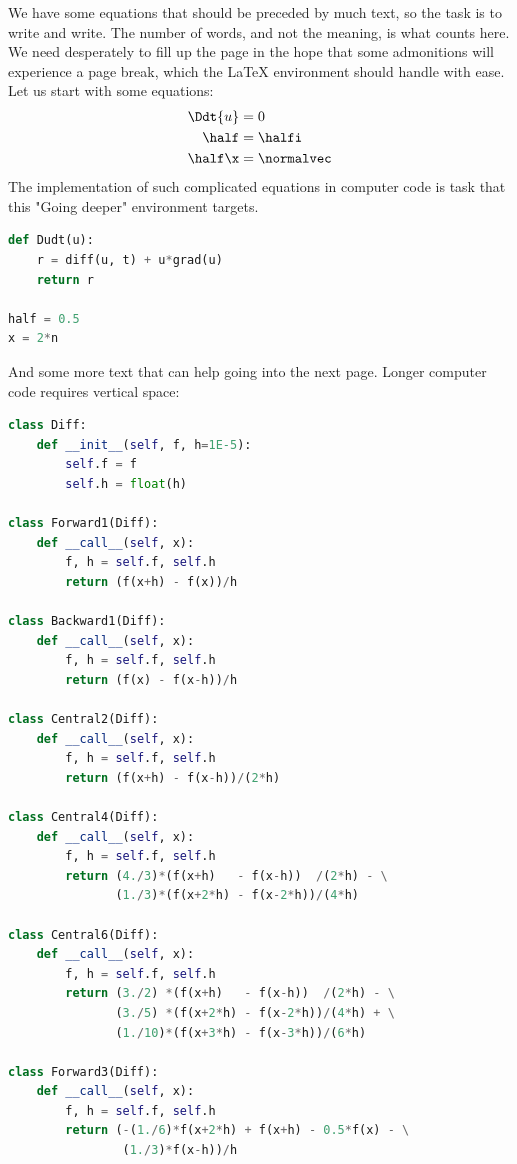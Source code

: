 \documentclass[%
oneside,                 %
final,                   %
10pt]{article}
\newenvironment{graybox2admon}[1][]{
\begin{graybox2mdframed}[frametitle=#1]
}
{
\end{graybox2mdframed}
}
\begin{document}
\begin{graybox2admon}[Going deeper.]
We have some equations that should be preceded by much text, so the
task is to write and write. The number of words, and not the
meaning, is what counts here. We need desperately to fill up the
page in the hope that some admonitions will experience a page break,
which the {\LaTeX} environment should handle with ease.
Let us start with some equations:
\begin{align*}
\Ddt{u} &= 0
\\
\half &= \halfi\\
\half\x &= \normalvec
\end{align*}
The implementation of such complicated equations in computer
code is task that this "Going deeper" environment targets.
\begin{lstlisting}[language=Python,style=simple,xleftmargin=2mm]
def Dudt(u):
    r = diff(u, t) + u*grad(u)
    return r

half = 0.5
x = 2*n

\end{lstlisting}

And some more text that can help going into the next page.
Longer computer code requires vertical space:
\begin{lstlisting}[language=Python,style=simple,xleftmargin=2mm]
class Diff:
    def __init__(self, f, h=1E-5):
        self.f = f
        self.h = float(h)

class Forward1(Diff):
    def __call__(self, x):
        f, h = self.f, self.h
        return (f(x+h) - f(x))/h

class Backward1(Diff):
    def __call__(self, x):
        f, h = self.f, self.h
        return (f(x) - f(x-h))/h

class Central2(Diff):
    def __call__(self, x):
        f, h = self.f, self.h
        return (f(x+h) - f(x-h))/(2*h)

class Central4(Diff):
    def __call__(self, x):
        f, h = self.f, self.h
        return (4./3)*(f(x+h)   - f(x-h))  /(2*h) - \
               (1./3)*(f(x+2*h) - f(x-2*h))/(4*h)

class Central6(Diff):
    def __call__(self, x):
        f, h = self.f, self.h
        return (3./2) *(f(x+h)   - f(x-h))  /(2*h) - \
               (3./5) *(f(x+2*h) - f(x-2*h))/(4*h) + \
               (1./10)*(f(x+3*h) - f(x-3*h))/(6*h)

class Forward3(Diff):
    def __call__(self, x):
        f, h = self.f, self.h
        return (-(1./6)*f(x+2*h) + f(x+h) - 0.5*f(x) - \
                (1./3)*f(x-h))/h


\end{lstlisting}
\end{graybox2admon}
\end{document}
